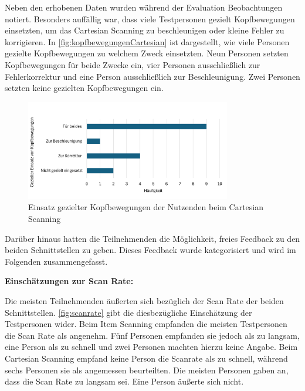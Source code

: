 Neben den erhobenen Daten wurden während der Evaluation Beobachtungen notiert. Besonders auffällig war, dass viele Testpersonen gezielt Kopfbewegungen einsetzten, um das Cartesian Scanning zu beschleunigen oder kleine Fehler zu korrigieren. In \autoref{fig:kopfbewegungenCartesian} ist dargestellt, wie viele Personen gezielte Kopfbewegungen zu welchem Zweck einsetzten. Neun Personen setzten Kopfbewegungen für beide Zwecke ein, vier Personen ausschließlich zur Fehlerkorrektur und eine Person ausschließlich zur Beschleunigung. Zwei Personen setzten keine gezielten Kopfbewegungen ein.

\begin{figure}[tbh]
    \centering
    \includegraphics[width=0.8\textwidth]{images/Results/EinsatzKopfbewegungen-Cartesian.png}
    \caption{Einsatz gezielter Kopfbewegungen der Nutzenden beim Cartesian Scanning}
    \label{fig:kopfbewegungenCartesian}
\end{figure}

Darüber hinaus hatten die Teilnehmenden die Möglichkeit, freies Feedback zu den beiden Schnittstellen zu geben. Dieses Feedback wurde kategorisiert und wird im Folgenden zusammengefasst. 

\textbf{Einschätzungen zur Scan Rate:}

Die meisten Teilnehmenden äußerten sich bezüglich der Scan Rate der beiden Schnittstellen. \autoref{fig:scanrate} gibt die diesbezügliche Einschätzung der Testpersonen wider. Beim Item Scanning empfanden die meisten Testpersonen die Scan Rate als angenehm. Fünf Personen empfanden sie jedoch als zu langsam, eine Person als zu schnell und zwei Personen machten hierzu keine Angabe. Beim Cartesian Scanning empfand keine Person die Scanrate als zu schnell, während sechs Personen sie als angemessen beurteilten. Die meisten Personen gaben an, dass die Scan Rate zu langsam sei. Eine Person äußerte sich nicht.

